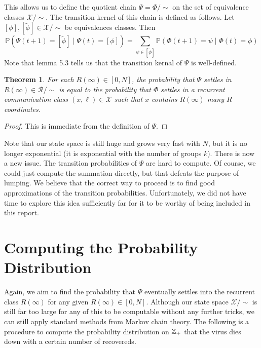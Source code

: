 \documentclass[a4paper]{article}
\newtheorem{theorem}{Theorem}[section]
\begin{document}
	This allows us to define the quotient chain $\Psi = \Phi/\sim$ on the set of equivalence classes $\mathcal{X}/\sim$. The transition kernel of this chain is defined as follows. Let $[\phi], [\tilde{\phi}] \in \mathcal{X} / \sim$ be equivalences classes. Then
	$$\mathbb{P}(\Psi(t + 1) = [\tilde{\phi}] \mid \Psi(t) = [\phi]) = \sum_{\psi \in [\tilde{\phi}]}\mathbb{P}(\Phi(t + 1) = \psi \mid \Phi(t) = \phi)$$
	Note that lemma 5.3 tells us that the transition kernal of $\Psi$ is well-defined.
	\begin{theorem}
		For each $R(\infty) \in [0, N]$, the probability that $\Psi$ settles in $R(\infty) \in \mathcal{R} / \sim$ is equal to the probability that $\Phi$ settles in a recurrent communication class $(x, \ell) \in \mathcal{X}$ such that $x$ contains $R(\infty)$ many $R$ coordinates.
	\end{theorem}
	\begin{proof}
		This is immediate from the definition of $\Psi$.
	\end{proof}
	Note that our state space is still huge and grows very fast with $N$, but it is no longer exponential (it is exponential with the number of groups $k$). There is now a new issue. The transition probabilities of $\Psi$ are hard to compute. Of course, we could just compute the summation directly, but that defeats the purpose of lumping. We believe that the correct way to proceed is to find good approximations of the transition probabilities. Unfortunately, we did not have time to explore this idea sufficiently far for it to be worthy of being included in this report.
	\section{Computing the Probability Distribution}
	Again, we aim to find the probability that $\Psi$ eventually settles into the recurrent class $R(\infty)$ for any given $R(\infty) \in [0, N]$. Although our state space $\mathcal{X}/\sim$ is still far too large for any of this to be computable without any further tricks, we can still apply standard methods from Markov chain theory. The following is a procedure to compute the probability distribution on $\mathbb{Z}_{+}$ that the virus dies down with a certain number of recovereds.
\end{document}
